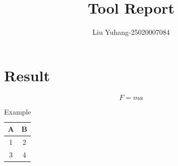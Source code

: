 \documentclass{article}
\begin{document}
\title{Tool Report}
\author{Liu Yuhang-25020007084}
\maketitle
\section{Result}
\begin{equation}
F=ma
\label{eq:Newton}
\end{equation}
\begin{table}[h]
\centering
\begin{tabular}{|c|c|}
\hline
A & B \\
\hline
1 & 2 \\
\hline
3 & 4 \\
\hline
\end{tabular}
\caption{Example}
\label{tab:sample}
\end{table}
\end{document}
